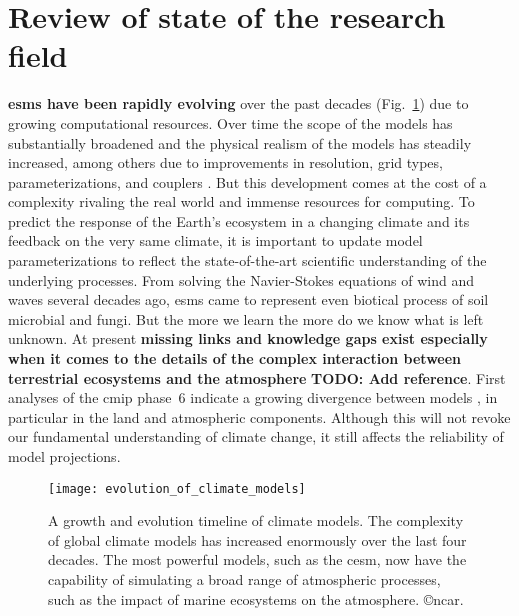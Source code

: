 \section{Review of state of the research field}
\label{sec:review}


\textbf{\glspl{esm} have been rapidly evolving} over the past decades (Fig.~\ref{fig:growth_esm}) due to growing computational resources. Over time the scope of the models has substantially broadened and the physical realism of the models has steadily increased, among others due to improvements in resolution, grid types, parameterizations, and couplers \parencite{AMS:Randall2018}. But this development comes at the cost of a complexity rivaling the real world and immense resources for computing. To predict the response of the Earth’s ecosystem in a changing climate and its feedback on the very same climate, it is important to update model parameterizations to reflect the state-of-the-art scientific understanding of the underlying processes. From solving the Navier-Stokes equations of wind and waves several decades ago, \glspl{esm} came to represent even biotical process of soil microbial and fungi. But the more we learn the more do we know what is left unknown. At present \textbf{missing links and knowledge gaps exist especially when it comes to the details of the complex interaction between terrestrial ecosystems and the atmosphere} \textbf{\color{red}TODO: Add reference}. First analyses of the \gls{cmip} phase~6 indicate a growing divergence between models \parencite{ESD:Tebaldi2021}, in particular in the land and atmospheric components. Although this will not revoke our fundamental understanding of climate change, it still affects the reliability of model projections.\\

\begin{figure}[!ht]
  \centering
  \texttt{[image: evolution\_of\_climate\_models]}
  \caption{A growth and evolution timeline of climate models. The complexity of global climate models has increased enormously over the last four decades. The most powerful models, such as the \gls{cesm}, now have the capability of simulating a broad range of atmospheric processes, such as the impact of marine ecosystems on the atmosphere. \copyright \gls{ncar}.}
  \label{fig:growth_esm}
  \vspace*{-10pt}
\end{figure}


